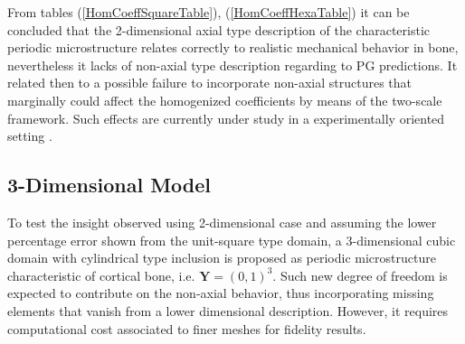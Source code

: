 From tables (\ref{HomCoeffSquareTable}), (\ref{HomCoeffHexaTable}) it can be concluded that the 2-dimensional axial type description of the characteristic periodic microstructure relates correctly to realistic mechanical behavior in bone, nevertheless it lacks of non-axial type description regarding to PG predictions. It related then to a possible failure to incorporate non-axial structures that marginally could affect the homogenized coefficients by means of the two-scale framework. Such effects are currently under study in a experimentally oriented setting \cite{Cai2019}.

\subsection{3-Dimensional Model}
To test the insight observed using 2-dimensional case and assuming the lower percentage error shown from the unit-square type domain, a 3-dimensional cubic domain with cylindrical type inclusion is proposed as periodic microstructure characteristic of cortical bone, i.e. $\mathbf{Y} = (0,1)^3$. Such new degree of freedom is expected to contribute on the non-axial behavior, thus incorporating missing elements that vanish from a lower dimensional description. However, it requires computational cost associated to finer meshes for fidelity results. \\

